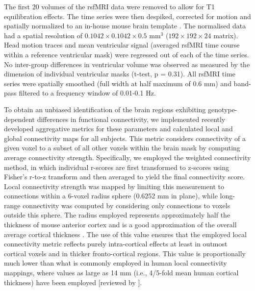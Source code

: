 The first 20 volumes of the rsfMRI data were removed to allow for T1
equilibration effects. The time series were then despiked, corrected for motion
and spatially normalized to an in-house mouse brain template
\parencite{sforazzini2014}.  The normalised data had a spatial resolution of
$0.1042 \times 0.1042 \times 0.5$ mm$^3$ ($192 \times 192 \times 24$ matrix).
Head motion traces and mean ventricular signal (averaged rsfMRI time course
within a reference ventricular mask) were regressed out of each of the time
series. No inter-group differences in ventricular volume was observed as
measured by the dimension of individual ventricular masks (t-test, p = 0.31).
All rsfMRI time series were spatially smoothed (full width at half maximum of
0.6 mm) and band-pass filtered to a frequency window of 0.01-0.1 Hz. 

To obtain an unbiased identification of the brain regions exhibiting
genotype-dependent differences in functional connectivity, we implemented
recently developed aggregative metrics for these parameters \parencite{cole2010,
maximo2013, liska2015} and calculated local and global connectivity maps for all
subjects. This metric considers connectivity of a given voxel to a subset of all
other voxels within the brain mask by computing average connectivity strength.
Specifically, we employed the weighted connectivity method, in which individual
r-scores are first transformed to z-scores using Fisher’s r-to-z transform and
then averaged to yield the final connectivity score. Local connectivity strength
was mapped by limiting this measurement to connections within a 6-voxel radius
sphere (0.6252 mm in plane), while long-range connectivity was computed by
considering only connections to voxels outside this sphere. The radius employed
represents approximately half the thickness of mouse anterior cortex
\parencite{dodero2013} and is a good approximation of the overall average
cortical thickness \parencite{braitenberg1998, sun2014}. The use of this value
ensures that the employed local connectivity metric reflects purely
intra-cortical effects at least in outmost cortical voxels and in thicker
fronto-cortical regions. This value is proportionally much lower than what is
commonly employed in human local connectivity mappings, where values as large as
14 mm (i.e., 4/5-fold mean human cortical thickness) have been employed
[reviewed by \parencite{maximo2013}].

